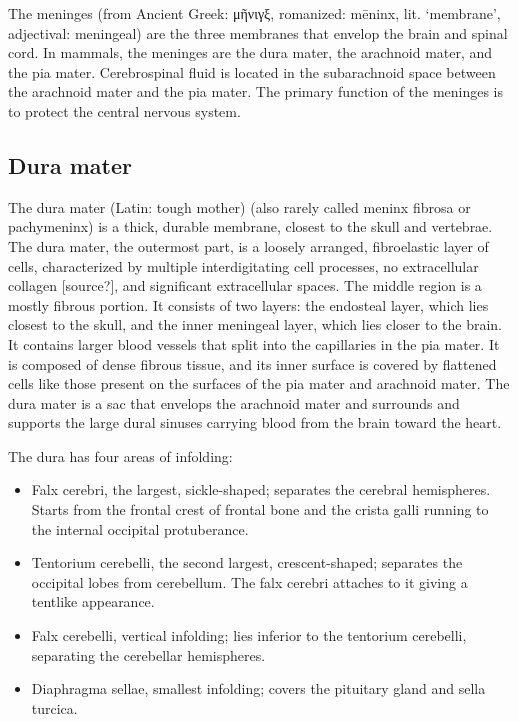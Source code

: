 The meninges (from Ancient Greek: μῆνιγξ, romanized: mēninx, lit. `membrane', adjectival: meningeal) are the three membranes that envelop the brain and spinal cord. In mammals, the meninges are the dura mater, the arachnoid mater, and the pia mater. Cerebrospinal fluid is located in the subarachnoid space between the arachnoid mater and the pia mater. The primary function of the meninges is to protect the central nervous system.

\hypertarget{dura-mater}{%
\subsection{Dura mater}\label{dura-mater}}

The dura mater (Latin: tough mother) (also rarely called meninx fibrosa or pachymeninx) is a thick, durable membrane, closest to the skull and vertebrae. The dura mater, the outermost part, is a loosely arranged, fibroelastic layer of cells, characterized by multiple interdigitating cell processes, no extracellular collagen {[}source?{]}, and significant extracellular spaces. The middle region is a mostly fibrous portion. It consists of two layers: the endosteal layer, which lies closest to the skull, and the inner meningeal layer, which lies closer to the brain. It contains larger blood vessels that split into the capillaries in the pia mater. It is composed of dense fibrous tissue, and its inner surface is covered by flattened cells like those present on the surfaces of the pia mater and arachnoid mater. The dura mater is a sac that envelops the arachnoid mater and surrounds and supports the large dural sinuses carrying blood from the brain toward the heart.

The dura has four areas of infolding:

\begin{itemize}
\tightlist
\item
  Falx cerebri, the largest, sickle-shaped; separates the cerebral hemispheres. Starts from the frontal crest of frontal bone and the crista galli running to the internal occipital protuberance.
\item
  Tentorium cerebelli, the second largest, crescent-shaped; separates the occipital lobes from cerebellum. The falx cerebri attaches to it giving a tentlike appearance.
\item
  Falx cerebelli, vertical infolding; lies inferior to the tentorium cerebelli, separating the cerebellar hemispheres.
\item
  Diaphragma sellae, smallest infolding; covers the pituitary gland and sella turcica.
\end{itemize}

